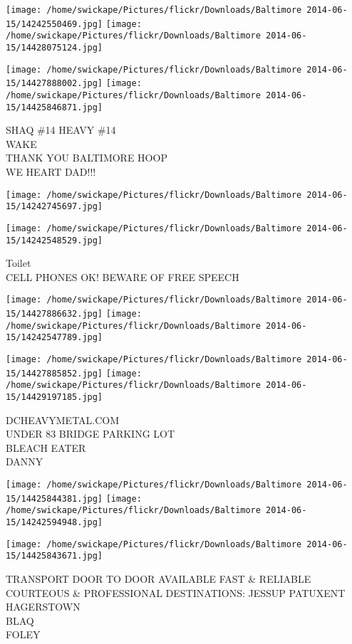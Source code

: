 \documentclass[10pt,letterpaper]{article}
\begin{document}
\texttt{[image: /home/swickape/Pictures/flickr/Downloads/Baltimore 2014-06-15/14242550469.jpg]}
\texttt{[image: /home/swickape/Pictures/flickr/Downloads/Baltimore 2014-06-15/14428075124.jpg]}

\texttt{[image: /home/swickape/Pictures/flickr/Downloads/Baltimore 2014-06-15/14427888002.jpg]}
\texttt{[image: /home/swickape/Pictures/flickr/Downloads/Baltimore 2014-06-15/14425846871.jpg]}

SHAQ \#14 HEAVY \#14\\
WAKE\\
THANK YOU BALTIMORE HOOP\\
WE HEART DAD!!!\\
\pagebreak

\texttt{[image: /home/swickape/Pictures/flickr/Downloads/Baltimore 2014-06-15/14242745697.jpg]}

\vspace{0.25in}
\texttt{[image: /home/swickape/Pictures/flickr/Downloads/Baltimore 2014-06-15/14242548529.jpg]}

Toilet\\
CELL PHONES OK!  BEWARE OF FREE SPEECH\\
\pagebreak

\texttt{[image: /home/swickape/Pictures/flickr/Downloads/Baltimore 2014-06-15/14427886632.jpg]}
\texttt{[image: /home/swickape/Pictures/flickr/Downloads/Baltimore 2014-06-15/14242547789.jpg]}

\texttt{[image: /home/swickape/Pictures/flickr/Downloads/Baltimore 2014-06-15/14427885852.jpg]}
\texttt{[image: /home/swickape/Pictures/flickr/Downloads/Baltimore 2014-06-15/14429197185.jpg]}

DCHEAVYMETAL.COM\\
UNDER 83 BRIDGE PARKING LOT\\
BLEACH EATER\\
DANNY\\
\pagebreak

\texttt{[image: /home/swickape/Pictures/flickr/Downloads/Baltimore 2014-06-15/14425844381.jpg]}
\texttt{[image: /home/swickape/Pictures/flickr/Downloads/Baltimore 2014-06-15/14242594948.jpg]}

\texttt{[image: /home/swickape/Pictures/flickr/Downloads/Baltimore 2014-06-15/14425843671.jpg]}

TRANSPORT DOOR TO DOOR AVAILABLE FAST \& RELIABLE COURTEOUS \& PROFESSIONAL DESTINATIONS: JESSUP PATUXENT HAGERSTOWN\\
BLAQ\\
FOLEY\\
\pagebreak
\end{document}
